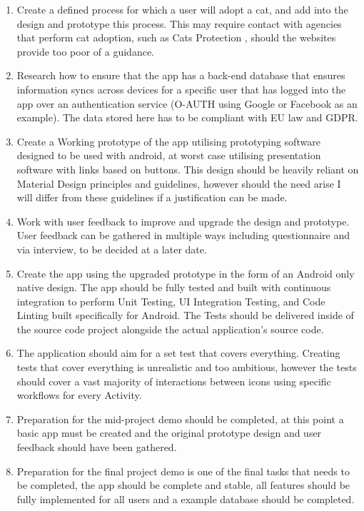 \documentclass[11pt,fleqn,twoside]{article}
\begin{document}
\begin{enumerate}
    \item Create a defined process for which a user will adopt a cat, and add into the design and prototype this process. This may require contact with agencies that perform cat adoption, such as Cats Protection \cite{CATSPROTECTION}, should the websites provide too poor of a guidance.
    
    \item Research how to ensure that the app has a back-end database that ensures information syncs across devices for a specific user that has logged into the app over an authentication service (O-AUTH\cite{OAUTH} using Google or Facebook as an example). The data stored here has to be compliant with EU law and GDPR\cite{GDPRARTICLE1}.
    
    \item Create a Working prototype of the app utilising prototyping software designed to be used with android, at worst case utilising presentation software with links based on buttons. This design should be heavily reliant on Material Design\cite{MATERIALDESIGNGUIDELINES} principles and guidelines, however should the need arise I will differ from these guidelines if a justification can be made.
    
    \item Work with user feedback to improve and upgrade the design and prototype. User feedback can be gathered in multiple ways including questionnaire and via interview, to be decided at a later date.
    
    \item Create the app using the upgraded prototype in the form of an Android only native design. The app should be fully tested and built with continuous integration to perform Unit Testing, UI Integration Testing, and Code Linting built specifically for Android. The Tests should be delivered inside of the source code project alongside the actual application's source code.
    
    \item The application should aim for a set test that covers everything. Creating tests that cover everything is unrealistic and too ambitious, however the tests should cover a vast majority of interactions between icons using specific workflows for every Activity.
    
    \item Preparation for the mid-project demo should be completed, at this point a basic app must be created and the original prototype design and user feedback should have been gathered.
    
    \item Preparation for the final project demo is one of the final tasks that needs to be completed, the app should be complete and stable, all features should be fully implemented for all users and a example database should be completed.
        
\end{enumerate}
\end{document}
